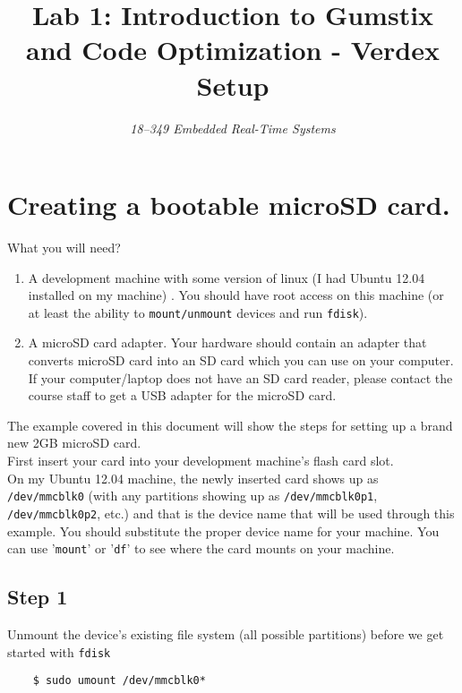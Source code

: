 \documentclass{article}
\title{\huge Lab 1: Introduction to Gumstix and Code Optimization 
       - Verdex Setup}
\author{\Large\itshape 18--349 Embedded Real-Time Systems}
\begin{document}
	\maketitle

	\section*{Creating a bootable microSD card.}

   What you will need?  \\

   \begin{enumerate}
   \item A development machine with some version of linux (I had Ubuntu 12.04
         installed on my machine) .  You should have root access on  this 
         machine (or at least the ability to \texttt{mount/unmount} devices and
         run \texttt{fdisk}).  
   \item A  microSD card adapter. Your hardware should contain an adapter that
         converts microSD card into an SD card which you can use on your
         computer. If your computer/laptop does not have an SD card reader,
         please contact the course staff  to get a USB adapter for the microSD
         card.
   \end{enumerate}

   The example covered in this document will show the steps for setting up 
   a brand new 2GB microSD card. \\

   First insert your card into your development machine's flash card slot. \\

   On my Ubuntu 12.04 machine, the newly inserted card shows up as
   \texttt{/dev/mmcblk0} (with any partitions showing up as
   \texttt{/dev/mmcblk0p1}, \texttt{/dev/mmcblk0p2}, etc.) and that  is the
   device name that will be used through this example. You should substitute
   the proper device name for your machine.  You can use '\texttt{mount}' or
   '\texttt{df}' to see where the card mounts on your machine. 

   \subsection*{Step 1}
   Unmount the device's existing file system (all possible partitions) before
   we get started with \texttt{fdisk} 
	\begin{verbatim} 
	$ sudo umount /dev/mmcblk0*
	\end{verbatim}
\end{document}

